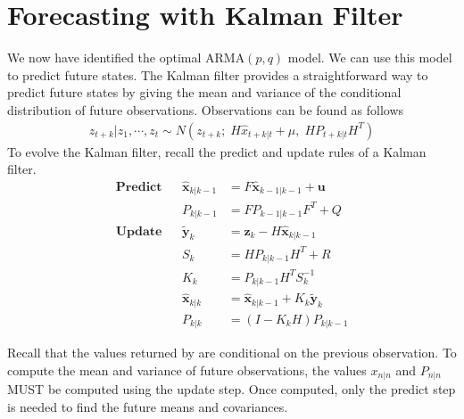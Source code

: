 \section*{Forecasting with Kalman Filter}
We now have identified the optimal ARMA$(p,q)$ model.
We can use this model to predict future states.
The Kalman filter provides a straightforward way to predict future states by giving the mean and variance of the conditional distribution of future observations.
Observations can be found as follows
\begin{align}
    z_{t + k} | z_{1}, \cdots, z_{t} \sim N(z_{t+k};\; H\hat{x}_{t+k|t} + \mu,\;
    HP_{t+k|t}H^T)
\end{align}
To evolve the Kalman filter, recall the predict and update rules of a Kalman filter.
\begin{align*}
\textbf{Predict} & & \widehat{\mathbf{x}}_{k|k-1} & = F\widehat{\mathbf{x}}_{k-1|k-1} + \mathbf{u} \\
 & & P_{k|k-1} & = FP_{k-1|k-1}F^{T} + Q \\
\textbf{Update} & & \tilde{\mathbf{y}}_{k} & = \mathbf{z}_{k} - H\widehat{\mathbf{x}}_{k|k-1} \\
 & & S_{k} & = HP_{k|k-1}H^{T} + R \\
 & & K_{k} & = P_{k|k-1}H^{T}S_{k}^{-1} \\
 & & \widehat{\mathbf{x}}_{k|k} & = \widehat{\mathbf{x}}_{k|k-1} + K_{k}\tilde{\mathbf{y}}_{k} \\
 & & P_{k|k} & = (I - K_{k}H)P_{k|k-1}
\end{align*}

\begin{warn}
Recall that the values returned by  are conditional on the previous observation.
To compute the mean and variance of future observations, the values $x_{n|n}$ and $P_{n|n}$ MUST be computed using the update step.
Once computed, only the predict step is needed to find the future means and covariances.
\end{warn}

